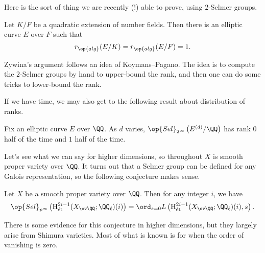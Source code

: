 \documentclass[../notes.tex]{subfiles}
\begin{document}
Here is the sort of thing we are recently (!) able to prove, using $2$-Selmer groups.
\begin{theorem}[Zywina]
	Let $K/F$ be a quadratic extension of number fields. Then there is an elliptic curve $E$ over $F$ such that
	\[r_{\op{alg}}(E/K)=r_{\op{alg}}(E/F)=1.\]
\end{theorem}
\begin{remark}
	Zywina's argument follows an idea of Koymans--Pagano. The idea is to compute the $2$-Selmer groups by hand to upper-bound the rank, and then one can do some tricks to lower-bound the rank.
\end{remark}
If we have time, we may also get to the following result about distribution of ranks.
\begin{theorem}[Smith]
	Fix an elliptic curve $E$ over $\QQ$. As $d$ varies, $\op{Sel}_{2^\infty}\left(E^{(d)}/\QQ\right)$ has rank $0$ half of the time and $1$ half of the time.
\end{theorem}
Let's see what we can say for higher dimensions, so throughout $X$ is smooth proper variety over $\QQ$. It turns out that a Selmer group can be defined for any Galois representation, so the following conjecture makes sense.
\begin{conj}
	Let $X$ be a smooth proper variety over $\QQ$. Then for any integer $i$, we have
	\[\op{Sel}_{p^\infty}\left(\mathrm H^{2i-1}_{\mathrm{\acute et}}(X_{\ov\QQ};\QQ_\ell)(i)\right)=\ord_{s=0}L\left(\mathrm H^{2i-1}_{\mathrm{\acute et}}(X_{\ov\QQ};\QQ_\ell)(i),s\right).\]
\end{conj}
There is some evidence for this conjecture in higher dimensions, but they largely arise from Shimura varieties. Most of what is known is for when the order of vanishing is zero.
\end{document}
